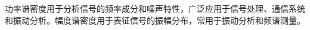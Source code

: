 \documentclass[dvipsnames, svgnames,a4paper,11pt]{article}
\begin{document}
        功率谱密度用于分析信号的频率成分和噪声特性，广泛应用于信号处理、通信系统和振动分析。幅度谱密度用于表征信号的振幅分布，常用于振动分析和频谱测量。










			


		
	



\end{document}

